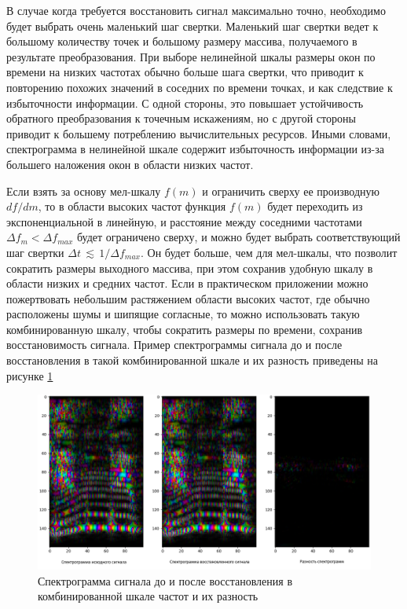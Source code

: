 В случае когда требуется восстановить сигнал максимально точно, необходимо будет выбрать очень маленький шаг свертки.
Маленький шаг свертки ведет к большому количеству точек и большому размеру массива, получаемого в результате преобразования. 
При выборе нелинейной шкалы размеры окон по времени на низких частотах обычно больше шага свертки, что приводит к 
повторению похожих значений в соседних по времени точках, и как следствие к избыточности информации. 
С одной стороны, это повышает устойчивость обратного преобразования к точечным искажениям, 
но с другой стороны приводит к большему потреблению вычислительных ресурсов. 
Иными словами, спектрограмма в нелинейной шкале содержит избыточность информации из-за большего наложения окон в области низких частот.

Если взять за основу мел-шкалу $f(m)$ и ограничить сверху ее производную $df/dm$, 
то в области высоких частот функция $f(m)$ будет переходить из экспоненциальной в линейную, и 
расстояние между соседними частотами $\Delta f_m < \Delta f_{max}$ будет ограничено сверху, 
и можно будет выбрать соответствующий шаг свертки $\Delta t \, \lesssim \, 1 / \Delta f_{max}$. 
Он будет больше, чем для мел-шкалы, что позволит сократить размеры выходного массива, 
при этом сохранив удобную шкалу в области низких и средних частот. 
Если в практическом приложении можно пожертвовать небольшим растяжением области высоких частот, где обычно расположены шумы и шипящие согласные,
то можно использовать такую комбинированную шкалу, чтобы сократить размеры по времени, сохранив восстановимость сигнала.
Пример спектрограммы сигнала до и после восстановления в такой комбинированной шкале и их разность приведены на рисунке \ref{fig:spec_diff_combo_scale}

\begin{figure}
  \centering
  \includegraphics[width=0.8\linewidth]{figures/spec_diff_combo_scale}
  \caption{Спектрограмма сигнала до и после восстановления в комбинированной шкале частот и их разность}
  \label{fig:spec_diff_combo_scale}
\end{figure}


